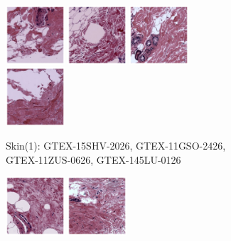 \documentclass{l4proj}
\begin{document}
\begin{figure}[t]
    \centering
    \begin{subfigure}[b]{\textwidth}
        \includegraphics[width=0.24\textwidth]{images/skin1_1.png}
        \includegraphics[width=0.24\textwidth]{images/skin1_2.png}
        \includegraphics[width=0.24\textwidth]{images/skin1_3.png}
        \includegraphics[width=0.24\textwidth]{images/skin1_4.png}
        \caption{Skin(1): GTEX-15SHV-2026, GTEX-11GSO-2426, GTEX-11ZUS-0626, GTEX-145LU-0126}
        \label{fig:skin1}
    \end{subfigure}
    \begin{subfigure}[b]{\textwidth}
        \includegraphics[width=0.24\textwidth]{images/breast1_1.png}
        \includegraphics[width=0.24\textwidth]{images/breast1_2.png}

\end{subfigure}
\end{figure}
\end{document}
